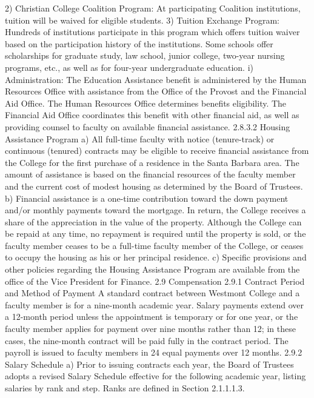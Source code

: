 \documentclass[letterpaper, 11pt]{article}
\begin{document}
	2) Christian College Coalition Program:  At participating Coalition institutions, tuition will be waived for eligible students.
	3) Tuition Exchange Program:  Hundreds of institutions participate in this program which offers tuition waiver based on the participation history of the institutions. Some schools offer scholarships for graduate study, law school, junior college, two-year nursing programs, etc., as well as for four-year undergraduate education.
	i) Administration:
	The Education Assistance benefit is administered by the Human Resources Office with assistance from the Office of the Provost and the Financial Aid Office.  The Human Resources Office determines benefits eligibility.  The Financial Aid Office coordinates this benefit with other financial aid, as well as providing counsel to faculty on available financial assistance.
	2.8.3.2 Housing Assistance Program
	a) All full-time faculty with notice (tenure-track) or continuous (tenured) contracts may be eligible to receive financial assistance from the College for the first purchase of a residence in the Santa Barbara area.  The amount of assistance is based on the financial resources of the faculty member and the current cost of modest housing as determined by the Board of Trustees.
	b) Financial assistance is a one-time contribution toward the down payment and/or monthly payments toward the mortgage.  In return, the College receives a share of the appreciation in the value of the property.  Although the College can be repaid at any time, no repayment is required until the property is sold, or the faculty member ceases to be a full-time faculty member of the College, or ceases to occupy the housing as his or her principal residence.
	c) Specific provisions and other policies regarding the Housing Assistance Program are available from the office of the Vice President for Finance.
	2.9 Compensation
	2.9.1 Contract Period and Method of Payment
	A standard contract between Westmont College and a faculty member is for a nine-month academic year.  Salary payments extend over a 12-month period unless the appointment is temporary or for one year, or the faculty member applies for payment over nine months rather than 12; in these cases, the nine-month contract will be paid fully in the contract period.  The payroll is issued to faculty members in 24 equal payments over 12 months.
	2.9.2 Salary Schedule
	a) Prior to issuing contracts each year, the Board of Trustees adopts a revised Salary Schedule effective for the following academic year, listing salaries by rank and step.  Ranks are defined in Section 2.1.1.1.3.
\end{document}

